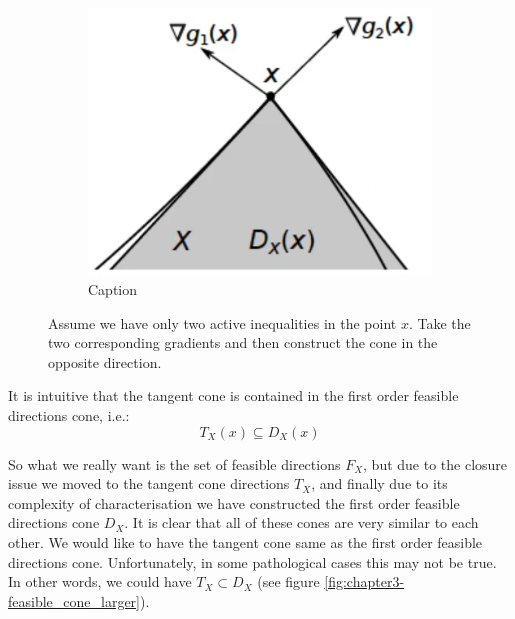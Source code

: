 \begin{figure}
    \begin{subfigure}{0.31\textwidth}
        \centering
        \includegraphics[width=\linewidth]{figures/3/chapter3-feasible_cone3.png}
        \caption{Caption}
        \label{fig:feasible3}
    \end{subfigure}
    \caption{Assume we have only two active inequalities in the point $x$. Take the two corresponding gradients and then construct the cone in the opposite direction.}
    \label{fig:chapter3-feasible_cone}
\end{figure}
\par It is intuitive that the tangent cone is contained in the first order feasible directions cone, i.e.:
\begin{equation}
    T_X(x) \subseteq D_X(x)
\end{equation}
\par So what we really want is the set of feasible directions $F_X$, but due to the closure issue we moved to the tangent cone directions $T_X$, and finally due to its complexity of characterisation we have constructed the first order feasible directions cone $D_X$. It is clear that all of these cones are very similar to each other. We would like to have the tangent cone same as the first order feasible directions cone. Unfortunately, in some pathological cases this may not be true. In other words, we could have $T_X \subset D_X$ (see figure \ref{fig:chapter3-feasible_cone_larger}).
